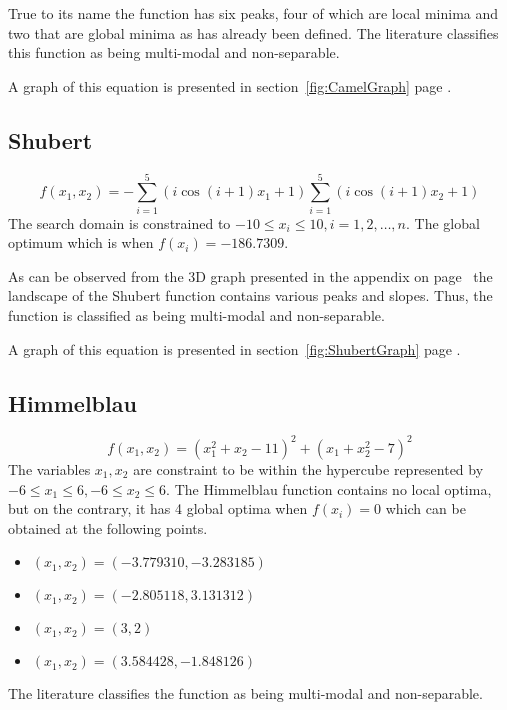 True to its name the function has six peaks, four of which are local minima and two that are global minima as has already been defined. The literature classifies this function as being multi-modal and non-separable\cite{ABCCompareStudy,TestFunctions}.

A graph of this equation is presented in section~\ref{fig:CamelGraph} page \pageref{fig:CamelGraph}.
\subsection{Shubert}
\begin{equation}
	f(x_1,x_2) = -\sum_{i = 1}^5 (i\cos{(i +1)x_1 + 1})\sum_{i=1}^5 (i\cos{(i+1)x_2 + 1})
\end{equation}
The search domain is constrained to $-10 \leq x_i \leq 10, i = 1,2, \ldots, n$\cite{ABCCompareStudy,TSGlobalOptimization,ContinACSTS,TestFunctions}. The global optimum which is when $f(x_i) = -186.7309$\cite{ABCCompareStudy,TSGlobalOptimization,ContinACSTS,TestFunctions}. 

As can be observed from the 3D graph presented in the appendix on page~\pageref{fig:ShubertGraph} the landscape of the Shubert function contains various peaks and slopes. Thus, the function is classified as being multi-modal and non-separable\cite{ABCCompareStudy,TestFunctions}.

A graph of this equation is presented in section~\ref{fig:ShubertGraph} page \pageref{fig:ShubertGraph}.
\subsection{Himmelblau}
\begin{equation}
	f(x_1,x_2) = (x_1^2 + x_2 - 11)^2 + (x_1 + x_2^2 - 7)^2
\end{equation}
The variables $x_1,x_2$ are constraint to be within the hypercube represented by $-6 \leq x_1 \leq 6, -6 \leq x_2 \leq 6$\cite{TestFunctions,ABCCompareStudy}. The Himmelblau function contains no local optima, but on the contrary, it has 4 global optima when $f(x_i) = 0$ which can be obtained at the following points\cite{TestFunctions,ABCCompareStudy}.
\begin{itemize}
\item $(x_1,x_2) = (-3.779310,-3.283185)$
\item $(x_1,x_2) = (-2.805118,3.131312)$
\item $(x_1,x_2) = (3,2)$
\item $(x_1,x_2) = (3.584428,-1.848126)$
\end{itemize}
The literature classifies the function as being multi-modal and non-separable\cite{TestFunctions,ABCCompareStudy}.

